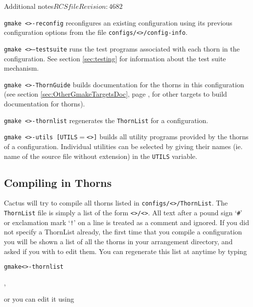 \begin{cactuspart}{Additional notes}{$RCSfile$}{$Revision: 4682 $}
\begin{Lentry}
\item [\texttt{gmake <\var{config}>-reconfig}] reconfigures an existing
configuration using its previous configuration options from the file
\texttt{configs/<>/config-info}.

\item [\texttt{gmake <\var{config}>--testsuite}] runs the test programs
associated with each thorn in the configuration. See section
\ref{sec:testing} for information about the test suite mechanism.

\item[\texttt{gmake <\var{config}>-ThornGuide}] builds documentation for the
thorns in this configuration
  (see section \ref{sec:OtherGmakeTargetsDoc}, page
  \pageref{sec:OtherGmakeTargetsDoc}, for other targets to build documentation
  for thorns).

\item [\texttt{gmake <\var{config}>-thornlist}] regenerates the
\texttt{ThornList} for a configuration.

\item [\texttt{gmake <\var{config}>-utils [UTILS$=$<\var{list}>]}] builds all
utility programs provided by the thorns of a configuration. Individual
utilities can be selected by giving their names (ie. name of the source file without extension) in the \texttt{UTILS} variable.

\end{Lentry}



\subsection{Compiling in Thorns}
\label{sec:cointh}

Cactus will try to compile all thorns listed in
\texttt{configs/<>/ThornList}.
The \texttt{ThornList} file is simply a list of the form
\texttt{<>/<>}.  All text after a pound sign
`\texttt{\#}' or exclamation mark `\texttt{!}'
on a line is treated as a comment and ignored.
If you did
not specify a ThornList already, the first time that you compile a configuration
you will be shown a list of all the thorns in your arrangement
directory, and asked if you with to edit them. You can regenerate
this list at anytime by typing

\begin{alltt}
gmake <>-thornlist
\end{alltt},

or you can edit it using


\end{cactuspart}
